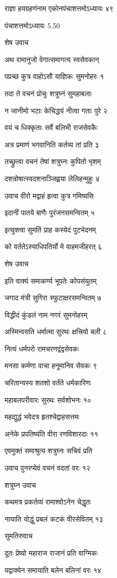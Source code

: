 राज्ञा हयग्रहणंनाम एकोनपंचाशत्तमोऽध्यायः ४९

पंचाशत्तमोऽध्यायः 5.50

शेष उवाच

अथ रामानुजो वेगात्समागत्य स्वसेवकान्

पप्रच्छ कुत्र वाहोऽसौ याज्ञिकः सुमनोहरः १

तदा ते वचनं प्रोचुः शत्रुघ्नं सुमहाबलाः

न जानीमो भटाः केचिद्धयं नीत्वा गताः पुरे २

वयं च धिक्कृताः सर्वे बलिभी राजसेवकैः

अत्र प्रमाणं भगवानिति कर्तव्य तां प्रति ३

तच्छ्रुत्वा वचनं तेषां शत्रुघ्नः कुपितो भृशम्

दशन्रोषात्स्वदशनाञ्जिह्वया लेलिहन्मुहुः ४

उवाच वीरो मद्वाहं हृत्वा कुत्र गमिष्यसि

इदानीं पातये बाणैः पुरंजनसमन्वितम् ५

इत्युक्त्वा सुमतिं प्राह कस्येदं पुटभेदनम्

को वर्ततेऽस्याधिपतिर्यो मे वाहमजीहरत् ६

शेष उवाच

इति वाक्यं समाकर्ण्य भूपतेः कोपसंयुतम्

जगाद मंत्री सुगिरा स्फुटाक्षरसमन्वितम् ७

विद्धीदं कुंडलं नाम नगरं सुमनोहरम्

अस्मिन्वसति धर्मात्मा सुरथः क्षत्त्रियो बली ८

नित्यं धर्मपरो रामचरणद्वंद्वसेवकः

मनसा कर्मणा वाचा हनूमानिव सेवकः ९

चरितान्यस्य शतशो वर्तंते धर्मकारिणः

महाबलपरीवारः सुरथः सर्वशोभनः १०

महद्युद्धं भवेदत्र हृतश्चेद्वाहसत्तमः

अनेके प्रपतिष्यंति वीरा रणविशारदाः ११

एवमुक्तं समाश्रुत्य शत्रुघ्नः सचिवं प्रति

उवाच पुनरप्येवं वचनं वदतां वरः १२

शत्रुघ्न उवाच

कथमत्र प्रकर्तव्यं रामाश्वोऽनेन चेद्धृतः

नायाति योद्धुं प्रबलं कटकं वीरसेवितम् १३

सुमतिरुवाच

दूतः प्रेष्यो महाराज राजानं प्रति वाग्मिकः

यद्वाक्येन समायाति बलेन बलिनां वरः १४

